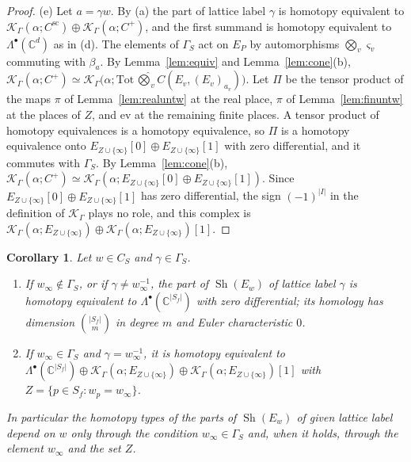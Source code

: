 \documentclass[11pt]{amsart}
\newtheorem{corollary}[theorem]{Corollary}
\theoremstyle{definition}
\theoremstyle{remark}
\newcommand{\C}{\mathbb C}
\newcommand{\Sh}{\operatorname{Sh}}
\begin{document}
\begin{proof}
(e)  Let $a=\gamma w$.  By (a) the part of lattice label $\gamma$ is homotopy
equivalent to $\mathcal K_{\Gamma}(\alpha;C^{\mathrm{sc}})\oplus
\mathcal K_{\Gamma}(\alpha;C^{+})$, and the first summand is homotopy
equivalent to $\Lambda^{\bullet}(\C^{d})$ as in (d).  The elements of $\Gamma_S$
act on $E_P$ by automorphisms $\bigotimes_v\varsigma_v$ commuting with $\beta_a$.
By Lemma~\ref{lem:equiv} and Lemma~\ref{lem:cone}(b),
$\mathcal K_{\Gamma}(\alpha;C^{+})\simeq\mathcal K_{\Gamma}\bigl(\alpha;
\mathrm{Tot}\,\widehat\bigotimes_vC(E_v,(E_v)_{a_v})\bigr)$.  Let $\Pi$ be the
tensor product of the maps $\pi$ of Lemma~\ref{lem:realuntw} at the real
place, $\pi$ of Lemma~\ref{lem:finuntw} at the places of $Z$, and
$\mathrm{ev}$ at the remaining finite places.  A tensor product of homotopy
equivalences is a homotopy equivalence, so $\Pi$ is a homotopy equivalence
onto $E_{Z\cup\{\infty\}}[0]\oplus E_{Z\cup\{\infty\}}[1]$ with zero
differential, and it commutes with
$\Gamma_S$.  By Lemma~\ref{lem:cone}(b),
$\mathcal K_{\Gamma}(\alpha;C^{+})\simeq\mathcal K_{\Gamma}(\alpha;E_{Z\cup\{\infty\}}[0]\oplus
E_{Z\cup\{\infty\}}[1])$.  Since $E_{Z\cup\{\infty\}}[0]\oplus E_{Z\cup\{\infty\}}[1]$ has zero
differential, the sign $(-1)^{|I|}$ in the definition of $\mathcal K_{\Gamma}$
plays no role, and this complex is
$\mathcal K_{\Gamma}(\alpha;E_{Z\cup\{\infty\}})\oplus
\mathcal K_{\Gamma}(\alpha;E_{Z\cup\{\infty\}})[1]$.
\end{proof}

\begin{corollary}\label{cor:blind}
Let $w\in C_S$ and $\gamma\in\Gamma_S$.
\begin{enumerate}
\item[(i)] If $w_{\infty}\notin\Gamma_S$, or if $\gamma\ne w_{\infty}^{-1}$, the
part of $\Sh(E_w)$ of lattice label $\gamma$ is homotopy equivalent to
$\Lambda^{\bullet}(\C^{|S_f|})$ with zero differential; its homology has
dimension $\binom{|S_f|}{m}$ in degree $m$ and Euler characteristic $0$.
\item[(ii)] If $w_{\infty}\in\Gamma_S$ and $\gamma=w_{\infty}^{-1}$, it is
homotopy equivalent to $\Lambda^{\bullet}(\C^{|S_f|})\oplus
\mathcal K_{\Gamma}(\alpha;E_{Z\cup\{\infty\}})\oplus\mathcal
K_{\Gamma}(\alpha;E_{Z\cup\{\infty\}})[1]$ with
$Z=\{p\in S_f:w_p=w_{\infty}\}$.
\end{enumerate}
In particular the homotopy types of the parts of $\Sh(E_w)$ of given lattice
label depend on $w$ only through the condition $w_{\infty}\in\Gamma_S$ and, when
it holds, through the element $w_{\infty}$ and the set $Z$.
\end{corollary}
\end{document}
